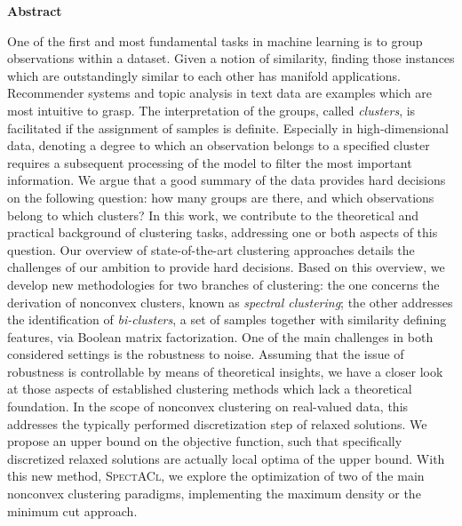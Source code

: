 \thispagestyle{plain}
\bigskip
\begin{center}
	\Large
    \textbf{Abstract}
\end{center}
One of the first and most fundamental tasks in machine learning is to group observations within a dataset. Given a notion of similarity, finding those instances which are outstandingly similar to each other has manifold applications. Recommender systems and topic analysis in text data are examples which are most intuitive to grasp. The interpretation of the groups, called \emph{clusters}, is facilitated if the assignment of samples is definite. Especially in high-dimensional data, denoting a degree to which an observation belongs to a specified cluster requires a subsequent processing of the model to filter the most important information. We argue that a good summary of the data provides hard decisions on the following question: how many groups are there, and which observations belong to which clusters? In this work, we contribute to the theoretical and practical background of clustering tasks, addressing one or both aspects of this question. Our overview of state-of-the-art clustering approaches details the challenges of our ambition to provide hard decisions. Based on this overview, we develop new methodologies for two branches of clustering: the one concerns the derivation of nonconvex clusters, known as \emph{spectral clustering}; the other addresses the identification of \emph{bi-clusters}, a set of samples together with similarity defining features, via Boolean matrix factorization. 
One of the main challenges in both considered settings is the robustness to noise. Assuming that the issue of robustness is controllable by means of theoretical insights, we have a closer look at those aspects of established clustering methods which lack a theoretical foundation. In the scope of nonconvex clustering on real-valued data, this addresses the typically performed discretization step of relaxed solutions. We propose an upper bound on the objective function, such that specifically discretized relaxed solutions are actually local optima of the upper bound. With this new method, \textsc{SpectACl}, we explore the optimization of two of the main nonconvex clustering paradigms, implementing the maximum density or the minimum cut approach. 
